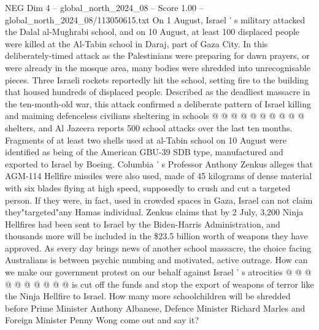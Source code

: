 \begin{textsample}{NEG Dim 4 – global\_north\_2024\_08 – Score 1.00 – global\_north\_2024\_08/113050615.txt}
On 1 August, Israel ' s military attacked the Dalal al-Mughrabi school, and on 10 August, at least 100 displaced people were killed at the Al-Tabin school in Daraj, part of Gaza City.
In this deliberately-timed attack as the Palestinians were preparing for dawn prayers, or were already in the mosque area, many bodies were shredded into unrecognisable pieces.
Three Israeli rockets reportedly hit the school, setting fire to the building that housed hundreds of displaced people.
Described as the deadliest massacre in the ten-month-old war, this attack confirmed a deliberate pattern of Israel killing and maiming defenceless civilians sheltering in schools @ @ @ @ @ @ @ @ @ @ shelters, and Al Jazeera reports 500 school attacks over the last ten months.
Fragments of at least two shells used at al-Tabin school on 10 August were identified as being of the American GBU-39 SDB type, manufactured and exported to Israel by Boeing.
Columbia ' s Professor Anthony Zenkus alleges that AGM-114 Hellfire missiles were also used, made of 45 kilograms of dense material with six blades flying at high speed, supposedly to crush and cut a targeted person.
If they were, in fact, used in crowded spaces in Gaza, Israel can not claim they"targeted"any Hamas individual.
Zenkus claims that by 2 July, 3,200 Ninja Hellfires had been sent to Israel by the Biden-Harris Administration, and thousands more will be included in the \$23.5 billion worth of weapons they have approved.
As every day brings news of another school massacre, the choice facing Australians is between psychic numbing and motivated, active outrage.
How can we make our government protest on our behalf against Israel ' s atrocities @ @ @ @ @ @ @ @ @ @ is cut off the funds and stop the export of weapons of terror like the Ninja Hellfire to Israel.
How many more schoolchildren will be shredded before Prime Minister Anthony Albanese, Defence Minister Richard Marles and Foreign Minister Penny Wong come out and say it?

\end{textsample}
